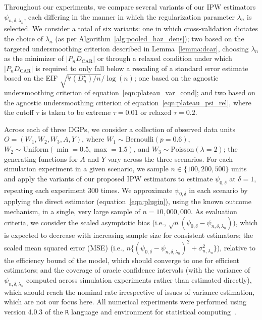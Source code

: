 Throughout our experiments, we compare several variants of our IPW estimators
$\psi_{n,\delta,\lambda_n}$, each differing in the manner in which the
regularization parameter $\lambda_n$ is selected. We consider a total of six
variants: one in which cross-validation dictates the choice of $\lambda_n$ (as
per Algorithm~\ref{alg:pooled_haz_dens}); two based on the targeted
undersmoothing criterion described in Lemma~\ref{lemma:dcar}, choosing
$\lambda_n$ as the minimizer of $\lvert P_n D_\text{CAR} \rvert$ or through
a relaxed condition under which $\lvert P_n D_\text{CAR} \rvert$ is required to
only fall below a rescaling of a standard error estimate based on the EIF
$\sqrt{\mathbb{V}(D^{\star}_n) / n}/ \log(n)$; one based on the agnostic
undersmoothing criterion of equation~\ref{eqn:plateau_var_cond}; and two based
on the agnostic undersmoothing criterion of equation~\ref{eqn:plateau_psi_rel},
where the cutoff $\tau$ is taken to be extreme $\tau = 0.01$ or relaxed $\tau
= 0.2$.

Across each of three DGPs, we consider a collection of observed data units
$O = (W_1, W_2, W_3, A, Y)$, where $W_1 \sim \text{Bernoulli}(p = 0.6)$,
$W_2 \sim \text{Uniform}(\min = 0.5, \max = 1.5)$, and
$W_3 \sim \text{Poisson}(\lambda = 2)$; the generating functions for $A$ and $Y$
vary across the three scenarios. For each simulation experiment in a given
scenario, we sample $n \in \{100, 200, 500\}$ units and apply the variants of
our proposed IPW estimators to estimate $\psi_{0,\delta}$ at $\delta = 1$,
repeating each experiment $300$ times. We approximate $\psi_{0,\delta}$ in each
scenario by applying the direct estimator (equation~\ref{eqn:plugin}), using the
known outcome mechanism, in a single, very large sample of $n = 10,000,000$.
As evaluation criteria, we consider the scaled asymptotic bias (i.e.,
$\sqrt{n}(\psi_{0,\delta} - \psi_{n,\delta,\lambda_n})$), which is expected to
decrease with increasing sample size for consistent estimators; the scaled mean
squared error (MSE) (i.e., $n \{(\psi_{0,\delta} - \psi_{n,\delta,\lambda_n})^2
+ \sigma_{n,\lambda_n}^2\}$), relative to the efficiency bound of the model,
which should converge to one for efficient estimators; and the coverage of
oracle confidence intervals (with the variance of $\psi_{n,\delta,\lambda_n}$
computed across simulation experiments rather than estimated directly), which
should reach the nominal rate irrespective of issues of variance estimation,
which are not our focus here. All numerical experiments were performed using
version 4.0.3 of the \texttt{R} language and environment for statistical
computing~\citep{R}.

